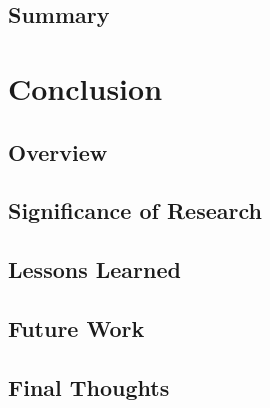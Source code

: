 \documentclass[12pt,letterpaper,oneside]{book}
\begin{document}
        \section{Summary}
        \label{Ch4Sum}
   		
        
    \chapter{Conclusion}
    \label{conclusion}
        \section{Overview}
        \label{conclusionoverview}
        
    	
    	\section{Significance of Research}
        \label{significance}
        
        
    	\section{Lessons Learned}
        \label{LessonsLearned}
        
        
        \section{Future Work}
        \label{FutureWork}
        
        
        \section{Final Thoughts}
        \label{finalthoughts}
        
        
    \appendix
     	
\backmatter
    
	\singlespace
	
    
    \clearpage
    
\end{document}
